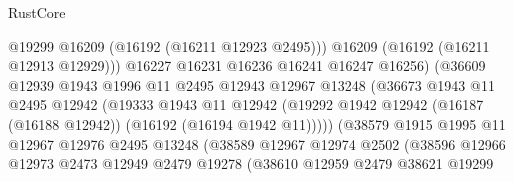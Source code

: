 \begin{lexlean}{RustCore}
\begin{coremodule}
                                      @19299
                                      @16209
                                      (@16192 (@16211 @12923 @2495)))
                                    @16209
                                    (@16192 (@16211 @12913 @12929)))
                                  @16227
                                  @16231
                                  @16236
                                  @16241
                                  @16247
                                  @16256)
                                (@36609
                                  @12939
                                  @1943
                                  @1996
                                  @11
                                  @2495
                                  @12943
                                  @12967
                                  @13248
                                  (@36673
                                    @1943
                                    @11
                                    @2495
                                    @12942
                                    (@19333
                                      @1943
                                      @11
                                      @12942
                                      (@19292
                                        @1942
                                        @12942
                                        (@16187 (@16188 @12942))
                                        (@16192 (@16194 @1942 @11)))))
                                  (@38579
                                    @1915
                                    @1995
                                    @11
                                    @12967
                                    @12976
                                    @2495
                                    @13248
                                    (@38589
                                      @12967
                                      @12974
                                      @2502
                                      (@38596
                                        @12966
                                        @12973
                                        @2473
                                        @12949
                                        @2479
                                        @19278
                                        (@38610
                                          @12959
                                          @2479
                                          @38621
                                          @19299

\end{coremodule}
\end{lexlean}
